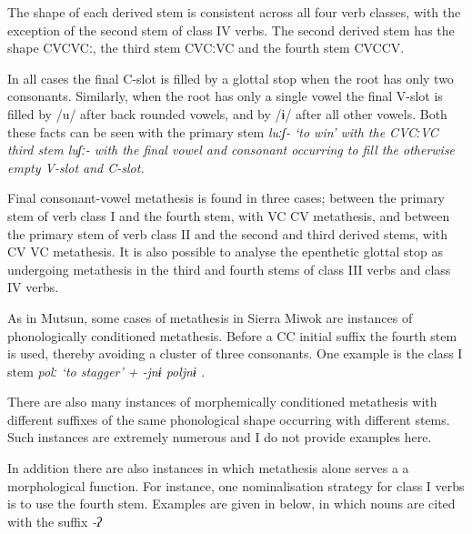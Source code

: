 The shape of each derived stem is consistent across all four verb classes,
with the exception of the second stem of class IV verbs.
The second derived stem has the shape CVCVCː,
the third stem CVCːVC and the fourth stem CVCCV.

In all cases the final C-slot is filled by a glottal stop
when the root has only two consonants.
Similarly, when the root has only a single vowel the final V-slot is filled
by /u/ after back rounded vowels,
and by /ɨ/ after all other vowels.
Both these facts can be seen with the primary stem \it{luːʃ-} `to win'
with the CVCːVC third stem \it{luʃː-}
with the final vowel and consonant
occurring to fill the otherwise empty V-slot and C-slot.

Final consonant-vowel metathesis is found in three cases;
between the primary stem of verb class I and the fourth stem,
with VC {\ra} CV metathesis,
and between the primary stem of verb class II
and the second and third derived stems,
with CV {\ra} VC metathesis.
It is also possible to analyse the epenthetic glottal stop as undergoing metathesis
in the third and fourth stems of class III verbs and class IV verbs.

As in Mutsun, some cases of metathesis in Sierra Miwok 
are instances of phonologically conditioned metathesis.
Before a CC initial suffix the fourth stem is used,
thereby avoiding a cluster of three consonants.
One example is the class I stem \it{polː}
`to stagger' + \it{-jnɨ} 
{\ra} \it{poljnɨ} \citep[116]{fr51}.

There are also many instances of morphemically conditioned metathesis
with different suffixes of the same phonological shape occurring with different stems.
Such instances are extremely numerous and I do not provide examples here.

In addition there are also instances
in which metathesis alone serves a a morphological function.
For instance, one nominalisation strategy
for class I verbs is to use the fourth stem.
Examples are given in  below,
in which nouns are cited with the  suffix \it{-ʔ}

